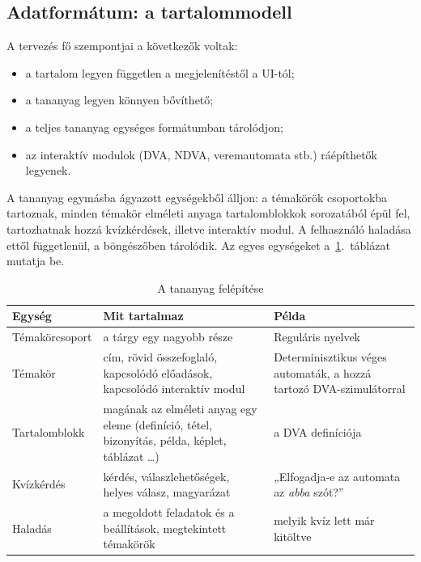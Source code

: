 \documentclass[12pt,a4paper]{report}
\begin{document}
\subsection{Adatformátum: a tartalommodell}
\label{sec:data}

A tervezés fő szempontjai a következők voltak:

\begin{itemize}
    \item a tartalom legyen független a megjelenítéstől a UI-tól;
    \item a tananyag legyen könnyen bővíthető;
    \item a teljes tananyag egységes formátumban tárolódjon;
    \item az interaktív modulok (DVA, NDVA, veremautomata stb.)
          ráépíthetők legyenek.
\end{itemize}

A tananyag egymásba ágyazott egységekből álljon: a témakörök
csoportokba tartoznak, minden témakör elméleti anyaga tartalomblokkok
sorozatából épül fel, tartozhatnak hozzá kvízkérdések, illetve interaktív
modul. A felhasználó haladása ettől függetlenül, a böngészőben
tárolódik. Az egyes egységeket a~\ref{tab:data-logical}.~táblázat
mutatja be.

\begin{table}[htbp]
    \centering
    \begin{tabularx}{\textwidth}{l X X}
        \toprule
        \textbf{Egység} & \textbf{Mit tartalmaz} & \textbf{Példa} \\
        \midrule
        Témakörcsoport & a tárgy egy nagyobb része
                       & Reguláris nyelvek \\
        Témakör        & cím, rövid összefoglaló, kapcsolódó előadások,
                         kapcsolódó interaktív modul
                       & Determinisztikus véges automaták, a hozzá
                         tartozó DVA-szimulátorral \\
        Tartalomblokk  & magának az elméleti anyag egy eleme (definíció, tétel,
                         bizonyítás, példa, képlet, táblázat \ldots)
                       & a DVA definíciója \\
        Kvízkérdés     & kérdés, válaszlehetőségek, helyes válasz,
                         magyarázat
                       & „Elfogadja-e az automata az \emph{abba} szót?” \\
        Haladás        & a megoldott feladatok és a beállítások, megtekintett témakörök
                       & melyik kvíz lett már kitöltve \\
        \bottomrule
    \end{tabularx}
    \caption{A tananyag felépítése}
    \label{tab:data-logical}
\end{table}
\end{document}
